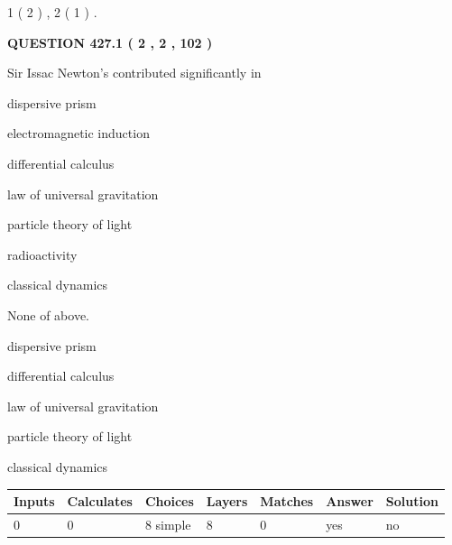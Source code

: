 \documentclass[12pt]{article}
\begin{document}
   
   1 ( 2 )
 ,
   2 ( 1 )
 .
  
\vspace{0.2in}
  
{\textbf{\Large{QUESTION
427.1 
 ( 2 , 2 , 102 )
}}}
  
  
Sir Issac Newton's contributed significantly in
 
 
dispersive prism
 
 
electromagnetic induction
 
 
differential calculus
 
 
law of universal gravitation
 
 
particle theory of light
 
 
radioactivity
 
 
classical dynamics
 
 
 None of above.
 
 
\noindent{}
 
 
dispersive prism
 
 
differential calculus
 
 
law of universal gravitation
 
 
particle theory of light
 
 
classical dynamics
 
 
\noindent{}
 
 
   
   
   
   
\noindent\begin{tabular}{|l|l|l|l|l|l|l|}
 \hline
Inputs & Calculates & Choices & Layers & Matches & Answer & Solution \\ \hline
 0  & 
 0  & 
 8
  simple  
  & 
 8  & 
 0  & 
  yes & 
  no 
  \\ \hline
 \end{tabular}
   
   
   
   
\noindent{}
   
\end{document}
